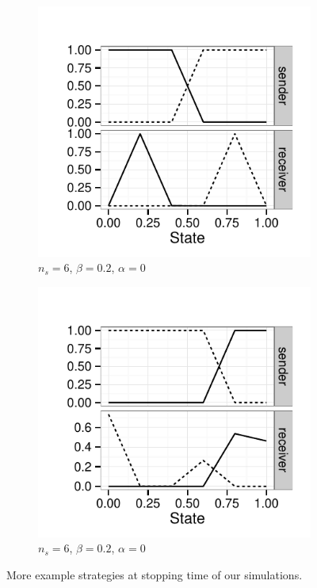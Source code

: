 \documentclass[12pt,english]{article}
\newcommand{\imprecision}{\ensuremath{\alpha}} %
\newcommand{\toler}{\ensuremath{\beta}} %
\newcommand{\ns}{\ensuremath{n_s}} %
\numberwithin{equation}{section}
\begin{document}
\begin{figure}
  \centering

  \begin{subfigure}[]{0.45\textwidth}
    \includegraphics[width=\textwidth]{plots/strat_example_ind21.pdf}
    \caption{$\ns = 6$, $\toler = 0.2$, $\imprecision = 0$}
    \label{fig:example_stratsC}
  \end{subfigure}
  \hfill
  \begin{subfigure}[]{0.45\textwidth}
    \includegraphics[width=\textwidth]{plots/strat_example_ind23.pdf}
    \caption{$\ns = 6$, $\toler = 0.2$, $\imprecision = 0$}
    \label{fig:example_stratsD}
  \end{subfigure}

  \caption{More example strategies at stopping time of our simulations.}
  \label{fig:MoreExample_strats}
\end{figure}
\end{document}
